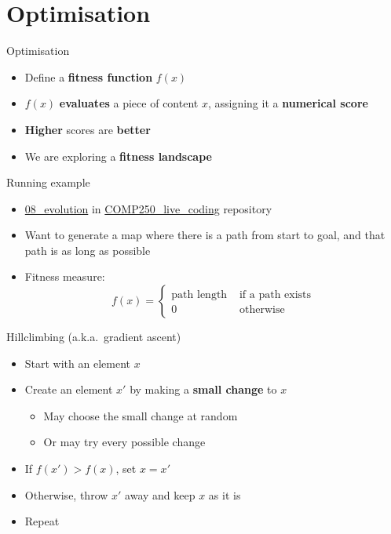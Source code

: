 \part{Optimisation}
\frame{\partpage}

\begin{frame}{Optimisation}
	\begin{itemize}
		\pause\item Define a \textbf{fitness function} $f(x)$
		\pause\item $f(x)$ \textbf{evaluates} a piece of content $x$, assigning it a \textbf{numerical score}
		\pause\item \textbf{Higher} scores are \textbf{better}
		\pause\item We are exploring a \textbf{fitness landscape}
	\end{itemize}
\end{frame}

\begin{frame}{Running example}
	\begin{itemize}
		\pause\item \url{08_evolution} in \url{COMP250_live_coding} repository
		\pause\item Want to generate a map where there is a path from start to goal,
			and that path is as long as possible
		\pause\item Fitness measure:
		$$ f(x) = \begin{cases}
			\text{path length} & \text{ if a path exists} \\
			0 & \text{ otherwise}
		\end{cases} $$
	\end{itemize}
\end{frame}

\begin{frame}{Hillclimbing (a.k.a.\ gradient ascent)}
	\begin{itemize}
		\pause\item Start with an element $x$
		\pause\item Create an element $x'$ by making a \textbf{small change} to $x$
			\begin{itemize}
				\pause\item May choose the small change at random
				\pause\item Or may try every possible change
			\end{itemize}
		\pause\item If $f(x') > f(x)$, set $x = x'$
		\pause\item Otherwise, throw $x'$ away and keep $x$ as it is
		\pause\item Repeat
	\end{itemize}
\end{frame}

